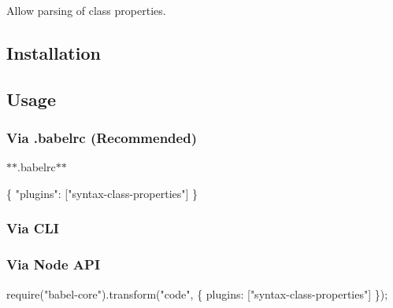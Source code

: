 Allow parsing of class properties.

\subsection*{Installation}




\subsection*{Usage}

\subsubsection*{Via {\ttfamily .babelrc} (Recommended)}

$\ast$$\ast$.babelrc$\ast$$\ast$


\begin{DoxyCode}
\{
  "plugins": ["syntax-class-properties"]
\}
\end{DoxyCode}


\subsubsection*{Via C\+LI}




\subsubsection*{Via Node A\+PI}


\begin{DoxyCode}
require("babel-core").transform("code", \{
  plugins: ["syntax-class-properties"]
\});
\end{DoxyCode}
 